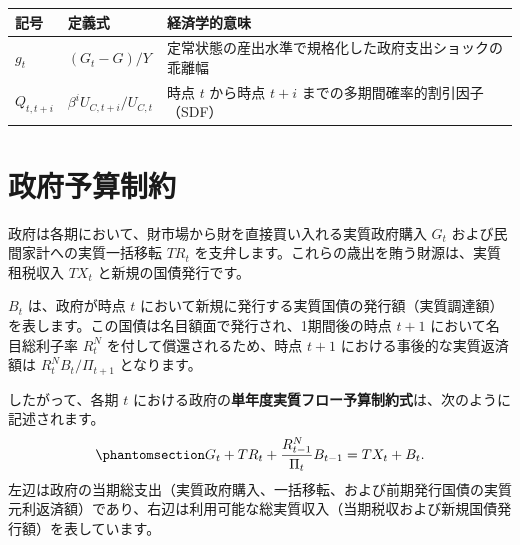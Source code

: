 \documentclass[
  japanese,
  lualatex,
  ja=standard,
  12pt,
  a4paper]{ltjsarticle}
\newcounter{none} %
\begin{document}
{\def\LTcaptype{none} %
\begin{longtable}[]{@{}
  >{\raggedright\arraybackslash}p{}
  >{\raggedright\arraybackslash}p{}
  >{\raggedright\arraybackslash}p{}@{}}
\toprule\noalign{}
\begin{minipage}[b]{\linewidth}\raggedright
記号
\end{minipage} & \begin{minipage}[b]{\linewidth}\raggedright
定義式
\end{minipage} & \begin{minipage}[b]{\linewidth}\raggedright
経済学的意味
\end{minipage} \\
\midrule\noalign{}
\endhead
\bottomrule\noalign{}
\endlastfoot
\(g_t\) & \((G_t - G)/Y\) &
定常状態の産出水準で規格化した政府支出ショックの乖離幅 \\
\(Q_{t,t+i}\) & \(\beta^i U_{C,t+i}/U_{C,t}\) & 時点 \(t\) から時点
\(t+i\) までの多期間確率的割引因子（SDF） \\
\end{longtable}
}

\section{政府予算制約}\label{ux653fux5e9cux4e88ux7b97ux5236ux7d04}

政府は各期において、財市場から財を直接買い入れる実質政府購入 \(G_t\)
および民間家計への実質一括移転 \(TR_t\)
を支弁します。これらの歳出を賄う財源は、実質租税収入 \(TX_t\)
と新規の国債発行です。

\(B_t\) は、政府が時点 \(t\)
において新規に発行する実質国債の発行額（実質調達額）を表します。この国債は名目額面で発行され、1期間後の時点
\(t+1\) において名目総利子率 \(R_t^N\) を付して償還されるため、時点
\(t+1\) における事後的な実質返済額は \(R_t^N B_t / \Pi_{t+1}\)
となります。

したがって、各期 \(t\)
における政府の\textbf{単年度実質フロー予算制約式}は、次のように記述されます。
\begin{equation}\protect\phantomsection\label{eq-government-flow-budget}{
G_t + TR_t + \frac{R_{t-1}^N}{\Pi_t} B_{t-1} = TX_t + B_t.
}\end{equation}
左辺は政府の当期総支出（実質政府購入、一括移転、および前期発行国債の実質元利返済額）であり、右辺は利用可能な総実質収入（当期税収および新規国債発行額）を表しています。
\end{document}
